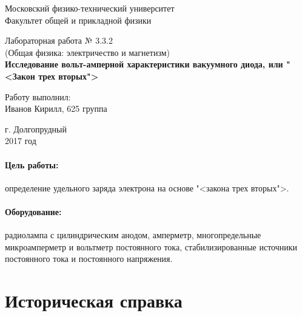 \documentclass[12pt]{kiarticle} %
\begin{document}
\begin{titlepage}
	\begin{center}
		\large 	Московский физико-технический университет \\
		Факультет общей и прикладной физики \\
		\vspace{0.2cm}
		
		\vspace{4.5cm}
		Лабораторная работа № 3.3.2 \\ \vspace{0.2cm}
		\large (Общая физика: электричество и магнетизм) \\ \vspace{0.2cm}
		\LARGE \textbf{Исследование вольт-амперной характеристики вакуумного диода, или "<Закон трех вторых">}
	\end{center}
	\vspace{2.3cm} \large
	
	\begin{center}
		Работу выполнил: \\
		Иванов Кирилл,
		625 группа
		\vspace{10mm}
		
	
		
		
	\end{center}
	
	\begin{center} \vspace{60mm}
		г. Долгопрудный \\
		 2017 год
	\end{center}
\end{titlepage}




\paragraph*{Цель работы:} определение удельного заряда электрона на основе "<закона трех вторых">.

\paragraph*{Оборудование:} радиолампа с цилиндрическим анодом, амперметр, многопредельные микроамперметр и вольтметр постоянного тока, стабилизированные источники постоянного тока и постоянного напряжения.


\section{Историческая справка}
\end{document}
